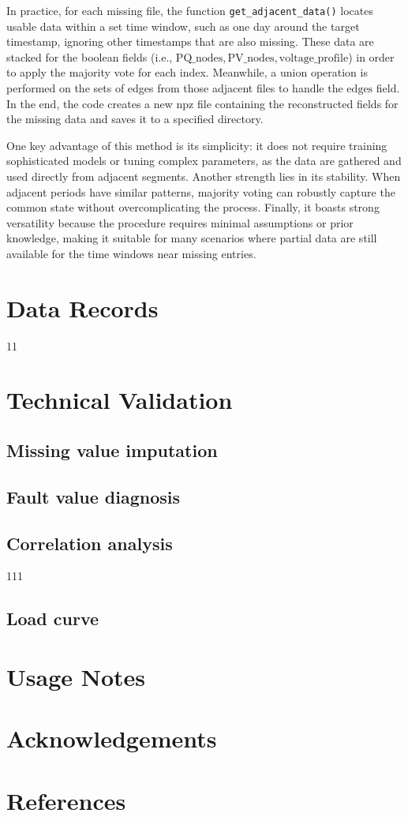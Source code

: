 \documentclass[12pt]{article}
\begin{document}
In practice, for each missing file, the function \texttt{get\_adjacent\_data()} locates usable data within a set time window, such as one day around the target timestamp, ignoring other timestamps that are also missing. These data are stacked for the boolean fields (i.e., \(\mathrm{PQ\_nodes}, \mathrm{PV\_nodes}, \mathrm{voltage\_profile}\)) in order to apply the majority vote for each index. Meanwhile, a union operation is performed on the sets of edges from those adjacent files to handle the \(\mathrm{edges}\) field. In the end, the code creates a new \(\mathrm{npz}\) file containing the reconstructed fields for the missing data and saves it to a specified directory.

One key advantage of this method is its simplicity: it does not require training sophisticated models or tuning complex parameters, as the data are gathered and used directly from adjacent segments. Another strength lies in its stability. When adjacent periods have similar patterns, majority voting can robustly capture the common state without overcomplicating the process. Finally, it boasts strong versatility because the procedure requires minimal assumptions or prior knowledge, making it suitable for many scenarios where partial data are still available for the time windows near missing entries.



\section*{Data Records}
11
\section*{Technical Validation}
\subsection*{Missing value imputation}

\subsection*{Fault value diagnosis}

\subsection*{Correlation analysis}
111\cite{example1}
\subsection*{Load curve}

\section*{Usage Notes}

\section*{Acknowledgements}

\section*{References}
\end{document}
